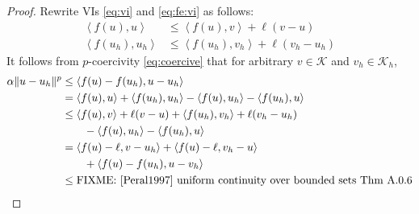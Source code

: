 \documentclass[hidelinks,onefignum,onetabnum,final]{siamart220329}  %
\newcommand{\cK}{\mathcal{K}}
\newcommand{\ip}[2]{\left<#1,#2\right>}
\begin{document}
\begin{proof}  Rewrite VIs \eqref{eq:vi} and \eqref{eq:fe:vi} as follows:
\begin{align*}
\ip{f(u)}{u} &\le \ip{f(u)}{v} + \ell(v-u) \\
\ip{f(u_h)}{u_h} &\le \ip{f(u_h)}{v_h} + \ell(v_h-u_h)
\end{align*}
It follows from $p$-coercivity \eqref{eq:coercive} that for arbitrary $v\in\cK$ and $v_h\in\cK_h$,
\begin{align*}
\alpha \|u-u_h\|^p &\le \ip{f(u)-f(u_h)}{u-u_h} \\
  &= \ip{f(u)}{u} + \ip{f(u_h)}{u_h} - \ip{f(u)}{u_h} - \ip{f(u_h)}{u} \\
  &\le \ip{f(u)}{v} + \ell(v-u) + \ip{f(u_h)}{v_h} + \ell(v_h-u_h) \\
  &\qquad - \ip{f(u)}{u_h} - \ip{f(u_h)}{u} \\
  &= \ip{f(u)-\ell}{v-u_h} + \ip{f(u)-\ell}{v_h-u} \\
  &\qquad + \ip{f(u)-f(u_h)}{u-v_h} \\
  &\le \text{FIXME: \cite{Peral1997} uniform continuity over bounded sets Thm A.0.6}
\end{align*}
\end{proof}



\end{document}
